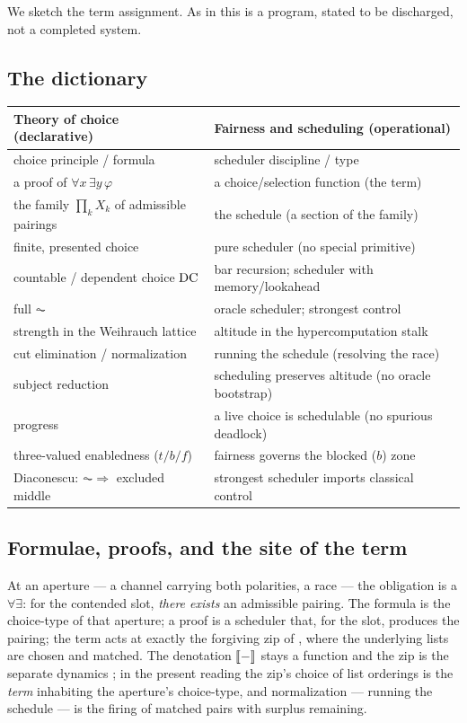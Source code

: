 We sketch the term assignment. As in \cite{consensus} this is a program, stated to be discharged, not
a completed system.

\subsection{The dictionary}

\begin{center}
\renewcommand{\arraystretch}{1.25}
\begin{tabular}{>{\raggedright}p{} >{\raggedright\arraybackslash}p{}}
\textbf{Theory of choice (declarative)} & \textbf{Fairness and scheduling (operational)}\\[2pt]
\hline
choice principle / formula & scheduler discipline / type\\
a proof of $\forall x\,\exists y\,\varphi$ & a choice/selection function (the term)\\
the family $\prod_k X_k$ of admissible pairings & the schedule (a section of the family)\\
finite, presented choice & pure scheduler (no special primitive)\\
countable / dependent choice $\mathrm{DC}$ & bar recursion; scheduler with memory/lookahead\\
full $\AC$ & oracle scheduler; strongest control\\
strength in the Weihrauch lattice & altitude in the hypercomputation stalk\\
cut elimination / normalization & running the schedule (resolving the race)\\
subject reduction & scheduling preserves altitude (no oracle bootstrap)\\
progress & a live choice is schedulable (no spurious deadlock)\\
three-valued enabledness ($t/b/f$) & fairness governs the blocked ($b$) zone\\
Diaconescu: $\AC \Rightarrow$ excluded middle & strongest scheduler imports classical control\\
\hline
\end{tabular}
\end{center}

\subsection{Formulae, proofs, and the site of the term}

At an aperture --- a channel carrying both polarities, a race --- the obligation is a $\forall\exists$:
for the contended slot, \emph{there exists} an admissible pairing. The formula is the choice-type of that
aperture; a proof is a scheduler that, for the slot, produces the pairing; the term acts at exactly the
forgiving zip of \cite{qcs}, where the underlying lists are chosen and matched. The denotation $\llbracket - \rrbracket$
stays a function and the zip is the separate dynamics \cite{qcs}; in the present reading the zip's choice
of list orderings is the \emph{term} inhabiting the aperture's choice-type, and normalization --- running
the schedule --- is the firing of matched pairs with surplus remaining.

